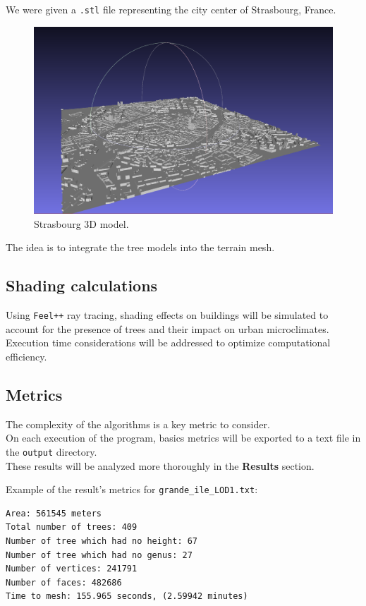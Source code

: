\documentclass[12pt]{article}
\begin{document}
We were given a \texttt{.stl} file representing the city center of Strasbourg, France.

\begin{figure}[H]
    \centering
    \includegraphics[width=1\textwidth]{images/strasbourg3d.png}
    \caption{Strasbourg 3D model.}
\end{figure}

The idea is to integrate the tree models into the terrain mesh.

\subsection{Shading calculations}
Using \texttt{Feel++} ray tracing, shading effects on buildings will be simulated to account for the presence
of trees and their impact on urban microclimates. Execution time considerations will be
addressed to optimize computational efficiency.

\subsection{Metrics}
The complexity of the algorithms is a key metric to consider. \\
On each execution of the program, basics metrics will be exported to a text file in 
the \texttt{output} directory. \\
These results will be analyzed more thoroughly in the \textbf{Results} section.

Example of the result's metrics for \texttt{grande\_ile\_LOD1.txt}:

\begin{lstlisting}
Area: 561545 meters
Total number of trees: 409
Number of tree which had no height: 67
Number of tree which had no genus: 27
Number of vertices: 241791
Number of faces: 482686
Time to mesh: 155.965 seconds, (2.59942 minutes)
\end{lstlisting}
\end{document}
